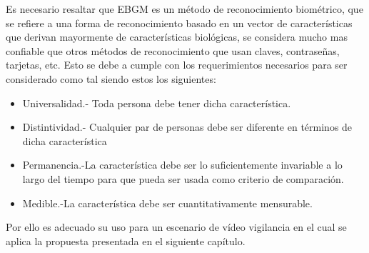 Es necesario resaltar que \ac{EBGM} es un método de reconocimiento biométrico, que se refiere a una forma de reconocimiento basado en un vector de características que derivan mayormente de características biológicas, se considera mucho mas confiable que otros métodos de reconocimiento que usan claves, contraseñas, tarjetas, etc. Esto se debe a cumple con los requerimientos necesarios para ser considerado como tal siendo estos los siguientes:

\begin{itemize}
\item Universalidad.- Toda persona debe tener dicha característica.
\item Distintividad.- Cualquier par de personas debe ser diferente en términos de dicha característica
\item Permanencia.-La característica debe ser lo suficientemente invariable a lo largo del tiempo para que pueda ser usada como criterio de comparación.
\item Medible.-La característica debe ser cuantitativamente mensurable.
\end{itemize}

Por ello es adecuado su uso para un escenario de vídeo vigilancia en el cual se aplica la propuesta presentada en el siguiente capítulo.

